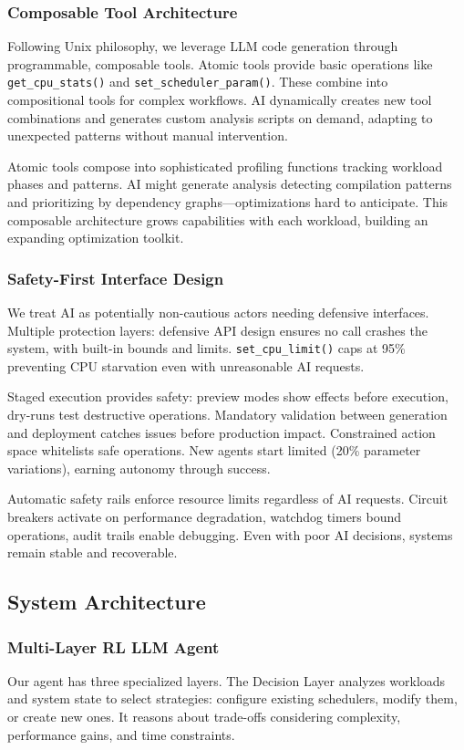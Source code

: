 \subsubsection{Composable Tool Architecture}
Following Unix philosophy, we leverage LLM code generation through programmable, composable tools. Atomic tools provide basic operations like \texttt{get\_cpu\_stats()} and \texttt{set\_scheduler\_param()}. These combine into compositional tools for complex workflows. AI dynamically creates new tool combinations and generates custom analysis scripts on demand, adapting to unexpected patterns without manual intervention.

Atomic tools compose into sophisticated profiling functions tracking workload phases and patterns. AI might generate analysis detecting compilation patterns and prioritizing by dependency graphs—optimizations hard to anticipate. This composable architecture grows capabilities with each workload, building an expanding optimization toolkit.

\subsubsection{Safety-First Interface Design}
We treat AI as potentially non-cautious actors needing defensive interfaces. Multiple protection layers: defensive API design ensures no call crashes the system, with built-in bounds and limits. \texttt{set\_cpu\_limit()} caps at 95\% preventing CPU starvation even with unreasonable AI requests.

Staged execution provides safety: preview modes show effects before execution, dry-runs test destructive operations. Mandatory validation between generation and deployment catches issues before production impact. Constrained action space whitelists safe operations. New agents start limited (20\% parameter variations), earning autonomy through success.

Automatic safety rails enforce resource limits regardless of AI requests. Circuit breakers activate on performance degradation, watchdog timers bound operations, audit trails enable debugging. Even with poor AI decisions, systems remain stable and recoverable.

\subsection{System Architecture}

\subsubsection{Multi-Layer RL LLM Agent}
Our agent has three specialized layers. The Decision Layer analyzes workloads and system state to select strategies: configure existing schedulers, modify them, or create new ones. It reasons about trade-offs considering complexity, performance gains, and time constraints.

